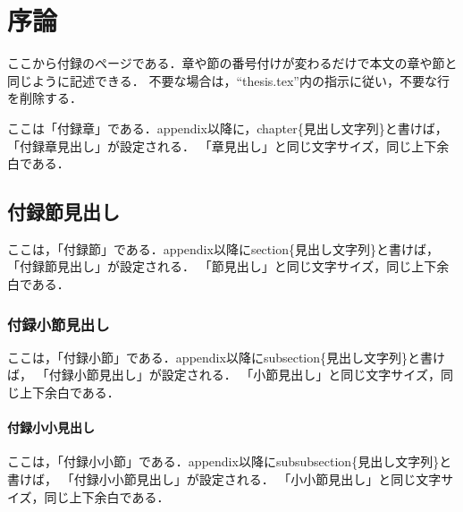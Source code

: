 \documentclass[11pt]{icsthesis}
\begin{document}
\clearpage

\fancyhead[L]{\nouppercase{\small\leftmark}}\fancyhead[R]{}
\renewcommand{\headrulewidth}{0.3truemm}


\clearpage
\fancyhead[L]{\nouppercase{\small\leftmark}}
\fancyhead[R]{\nouppercase{\small\rightmark}}
\fancyfoot[C]{--\ \thepage\ --}
\renewcommand{\headrulewidth}{0.3truemm}
\appendix
\chapter{序論}
ここから付録のページである．章や節の番号付けが変わるだけで本文の章や節と同じように記述できる．
不要な場合は，``\textsf{thesis.tex}''内の指示に従い，不要な行を削除する．

ここは「付録章」である．\textsf{\yen appendix}以降に，\textsf{\yen chapter\{見出し文字列\}}と書けば，
「付録章見出し」が設定される．
「章見出し」と同じ文字サイズ，同じ上下余白である．

\section{付録節見出し}
ここは，「付録節」である．\textsf{\yen appendix}以降に\textsf{\yen section\{見出し文字列\}}と書けば，
「付録節見出し」が設定される．
「節見出し」と同じ文字サイズ，同じ上下余白である．

\subsection{付録小節見出し}
ここは，「付録小節」である．\textsf{\yen appendix}以降に\textsf{\yen subsection\{見出し文字列\}}と書けば，
「付録小節見出し」が設定される．
「小節見出し」と同じ文字サイズ，同じ上下余白である．

\subsubsection{付録小小見出し}
ここは，「付録小小節」である．\textsf{\yen appendix}以降に\textsf{\yen subsubsection\{見出し文字列\}}と書けば，
「付録小小節見出し」が設定される．
「小小節見出し」と同じ文字サイズ，同じ上下余白である．
\end{document}
